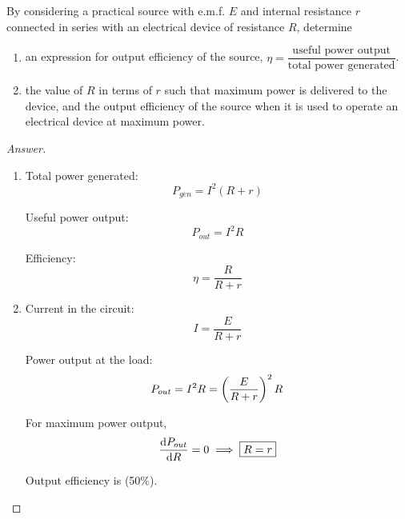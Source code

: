 \begin{prbm}
By considering a practical source with e.m.f. $E$ and internal resistance $r$ connected in series with an electrical device of resistance $R$, determine
\begin{enumerate}[label=(\roman*)]
\item an expression for output efficiency of the source, $\eta=\dfrac{\text{useful power output}}{\text{total power generated}}$.
\item the value of $R$ in terms of $r$ such that maximum power is delivered to the device, and the output efficiency of the source when it is used to operate an electrical device at maximum power.
\end{enumerate}
\end{prbm}

\begin{proof}[Answer] \
\begin{enumerate}[label=(\roman*)]
\item Total power generated:
\[ P_{gen}=I^2(R+r) \]

Useful power output:
\[ P_{out}=I^2R \]

Efficiency:
\[ \boxed{\eta = \frac{R}{R+r}} \]

\item Current in the circuit:
\[ I = \frac{E}{R+r} \]

Power output at the load:
\[ P_{out} = I^2R = \left(\frac{E}{R+r}\right)^2R \]

For maximum power output,
\[ \dv{P_{out}}{R} = 0 \implies \boxed{R=r} \]

Output efficiency is  (50\%).
\end{enumerate}
\end{proof}
\pagebreak